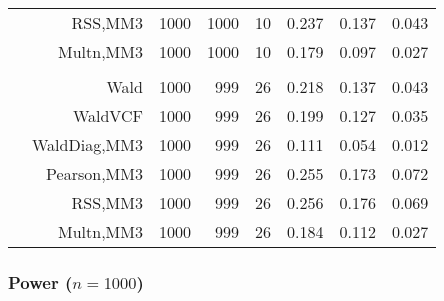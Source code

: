 \documentclass[
]{article}
\begin{document}
\begin{table}[H]
{\begin{tabular}[t]{lrrrrrrr}
\hspace{1em} & RSS,MM3 & 1000 & 1000 & 10 & 0.237 & 0.137 & 0.043\\

\hspace{1em} & Multn,MM3 & 1000 & 1000 & 10 & 0.179 & 0.097 & 0.027\\
\cmidrule{1-8}
\addlinespace[0.3em]
\multicolumn{8}{l}{\textbf{3F 15V}}\\
\hspace{1em} & Wald & 1000 & 999 & 26 & 0.218 & 0.137 & 0.043\\

\hspace{1em} & WaldVCF & 1000 & 999 & 26 & 0.199 & 0.127 & 0.035\\

\hspace{1em} & WaldDiag,MM3 & 1000 & 999 & 26 & 0.111 & 0.054 & 0.012\\

\hspace{1em} & Pearson,MM3 & 1000 & 999 & 26 & 0.255 & 0.173 & 0.072\\

\hspace{1em} & RSS,MM3 & 1000 & 999 & 26 & 0.256 & 0.176 & 0.069\\

\hspace{1em} & Multn,MM3 & 1000 & 999 & 26 & 0.184 & 0.112 & 0.027\\
\bottomrule
\end{tabular}}
\endgroup{}
\end{table}

\hypertarget{power-n1000}{%
\subsubsection{\texorpdfstring{Power
(\(n=1000\))}{Power (n=1000)}}\label{power-n1000}}
\end{document}
